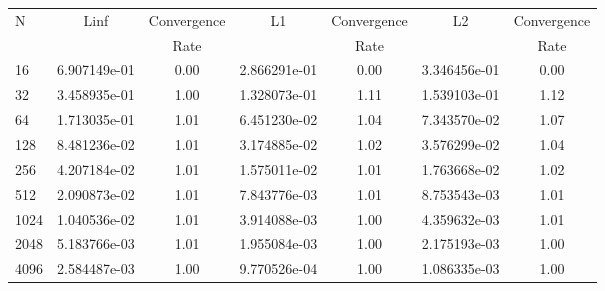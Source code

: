 \documentclass[12pt]{article}
\begin{document}
	\begin{tabular}{l|c|c|c|c|c|c}
		N&Linf&Convergence&L1&Convergence&L2&Convergence\\
		&&Rate&&Rate&&Rate\\
		\hline
		16&6.907149e-01&0.00&2.866291e-01&0.00&3.346456e-01&0.00\\
		\hline
		32&3.458935e-01&1.00&1.328073e-01&1.11&1.539103e-01&1.12\\
		\hline
		64&1.713035e-01&1.01&6.451230e-02&1.04&7.343570e-02&1.07\\
		\hline
		128&8.481236e-02&1.01&3.174885e-02&1.02&3.576299e-02&1.04\\
		\hline
		256&4.207184e-02&1.01&1.575011e-02&1.01&1.763668e-02&1.02\\
		\hline
		512&2.090873e-02&1.01&7.843776e-03&1.01&8.753543e-03&1.01\\
		\hline
		1024&1.040536e-02&1.01&3.914088e-03&1.00&4.359632e-03&1.01\\
		\hline
		2048&5.183766e-03&1.01&1.955084e-03&1.00&2.175193e-03&1.00\\
		\hline
		4096&2.584487e-03&1.00&9.770526e-04&1.00&1.086335e-03&1.00\\
	\end{tabular}
\end{document}
